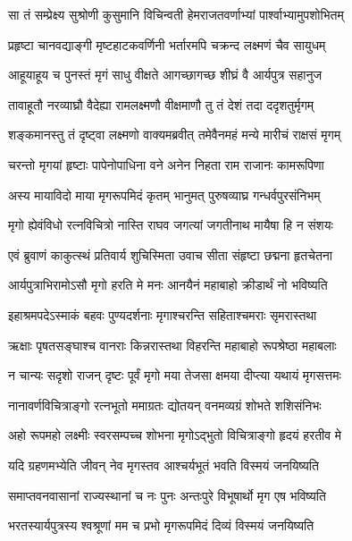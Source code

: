 
\twolineshloka
{सा तं सम्प्रेक्ष्य सुश्रोणी कुसुमानि विचिन्वती}
{हेमराजतवर्णाभ्यां पार्श्वाभ्यामुपशोभितम्} %

\twolineshloka
{प्रहृष्टा चानवद्याङ्गी मृष्टहाटकवर्णिनी}
{भर्तारमपि चक्रन्द लक्ष्मणं चैव सायुधम्} %

\twolineshloka
{आहूयाहूय च पुनस्तं मृगं साधु वीक्षते}
{आगच्छागच्छ शीघ्रं वै आर्यपुत्र सहानुज} %

\twolineshloka
{तावाहूतौ नरव्याघ्रौ वैदेह्या रामलक्ष्मणौ}
{वीक्षमाणौ तु तं देशं तदा ददृशतुर्मृगम्} %

\twolineshloka
{शङ्कमानस्तु तं दृष्ट्वा लक्ष्मणो वाक्यमब्रवीत्}
{तमेवैनमहं मन्ये मारीचं राक्षसं मृगम्} %

\twolineshloka
{चरन्तो मृगयां हृष्टाः पापेनोपाधिना वने}
{अनेन निहता राम राजानः कामरूपिणा} %

\twolineshloka
{अस्य मायाविदो माया मृगरूपमिदं कृतम्}
{भानुमत् पुरुषव्याघ्र गन्धर्वपुरसंनिभम्} %

\twolineshloka
{मृगो ह्येवंविधो रत्नविचित्रो नास्ति राघव}
{जगत्यां जगतीनाथ मायैषा हि न संशयः} %

\twolineshloka
{एवं ब्रुवाणं काकुत्स्थं प्रतिवार्य शुचिस्मिता}
{उवाच सीता संहृष्टा छद्मना हृतचेतना} %

\twolineshloka
{आर्यपुत्राभिरामोऽसौ मृगो हरति मे मनः}
{आनयैनं महाबाहो क्रीडार्थं नो भविष्यति} %

\twolineshloka
{इहाश्रमपदेऽस्माकं बहवः पुण्यदर्शनाः}
{मृगाश्चरन्ति सहिताश्चमराः सृमरास्तथा} %

\twolineshloka
{ऋक्षाः पृषतसङ्घाश्च वानराः किन्नरास्तथा}
{विहरन्ति महाबाहो रूपश्रेष्ठा महाबलाः} %

\twolineshloka
{न चान्यः सदृशो राजन् दृष्टः पूर्वं मृगो मया}
{तेजसा क्षमया दीप्त्या यथायं मृगसत्तमः} %

\twolineshloka
{नानावर्णविचित्राङ्गो रत्नभूतो ममाग्रतः}
{द्योतयन् वनमव्यग्रं शोभते शशिसंनिभः} %

\twolineshloka
{अहो रूपमहो लक्ष्मीः स्वरसम्पच्च शोभना}
{मृगोऽद्भुतो विचित्राङ्गो हृदयं हरतीव मे} %

\twolineshloka
{यदि ग्रहणमभ्येति जीवन् नेव मृगस्तव}
{आश्चर्यभूतं भवति विस्मयं जनयिष्यति} %

\twolineshloka
{समाप्तवनवासानां राज्यस्थानां च नः पुनः}
{अन्तःपुरे विभूषार्थो मृग एष भविष्यति} %

\twolineshloka
{भरतस्यार्यपुत्रस्य श्वश्रूणां मम च प्रभो}
{मृगरूपमिदं दिव्यं विस्मयं जनयिष्यति} %

